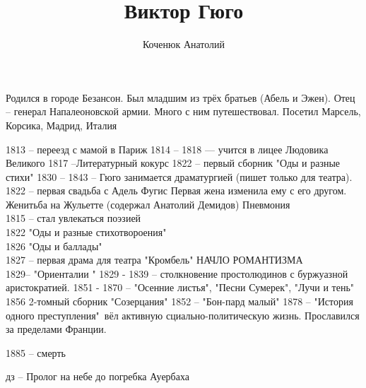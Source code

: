 \documentclass[10pt,a4paper]{article}
\author{Коченюк Анатолий}
\title{Виктор Гюго}
\begin{document}
 \maketitle
 Родился в городе Безансон.
 Был младшим из трёх братьев (Абель и Эжен).
 Отец -- генерал Напалеоновской армии. Много с ним путешествовал.
 Посетил Марсель, Корсика, Мадрид, Италия
 
 1813 -- переезд с мамой в Париж
 1814 -- 1818 --- учится в лицее Людовика Великого
 1817 --Литературный кокурс
 1822 -- первый сборник "Оды и разные стихи"
 1830 -- 1843 -- Гюго занимается драматургией (пишет только для театра).
 1822 -- первая свадьба с Адель Фугис
 Первая жена изменила ему с его другом.
Женитьба на Жульетте (содержал Анатолий Демидов)
Пневмония\\
1815  -- стал увлекаться поэзией\\
1822 "Оды и разные стихотвороения"\\
1826 "Оды и баллады"\\
1827 -- первая драма для театра "Кромбель" НАЧЛО РОМАНТИЗМА\\
1829-- "Ориенталии	"
1829 - 1839 -- столкновение простолюдинов с буржуазной аристократией.
1851 - 1870 -- "Осенние листья", "Песни Сумерек", "Лучи и тень"
1856 2-томный сборник "Созерцания"
1852 -- "Бон-пард малый"
1878 -- "История одного преступления"\
вёл активную сциально-политическую жизнь. Прославился за пределами Франции.

1885 -- смерть

дз -- Пролог на небе до погребка Ауербаха
 
\end{document}
